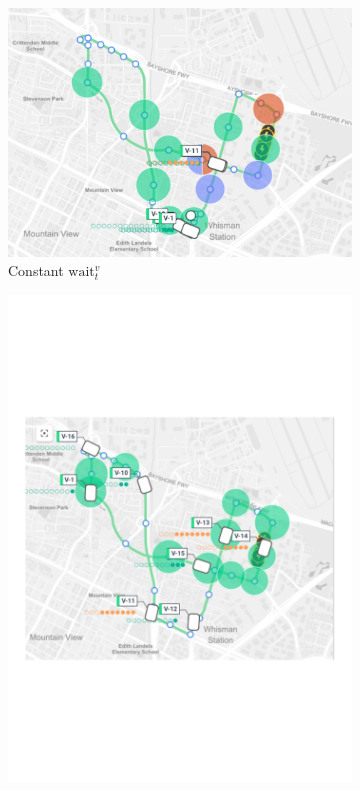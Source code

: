 \documentclass[12pt,a4paper]{article}
\begin{document}
\begin{figure}
  \centering
\begin{subfigure}[b]{0.435\textwidth}
  \includegraphics[width=\linewidth]{./images/busbunching.pdf}
  \caption{Constant $\text{wait}_t^{v}$}
  \label{busbunching}
\end{subfigure}
\begin{subfigure}[b]{0.4\textwidth}
  \includegraphics[width=\linewidth]{./images/spread.pdf}

\end{subfigure}
\end{figure}
\end{document}
